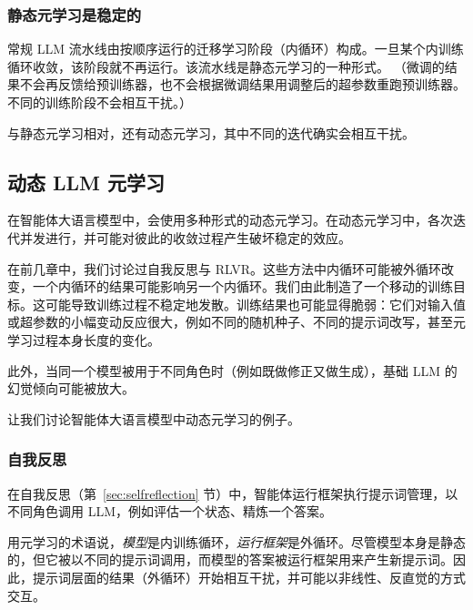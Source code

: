 \subsubsection{静态元学习是稳定的}
常规 LLM 流水线由按顺序运行的迁移学习阶段（内循环）构成。一旦某个内训练循环收敛，该阶段就不再运行。该流水线是静态元学习的一种形式。%
（微调的结果不会再反馈给预训练器，也不会根据微调结果用调整后的超参数重跑预训练器。不同的训练阶段不会相互干扰。）

与静态元学习相对，还有动态元学习，其中不同的迭代确实会相互干扰。


\subsection{动态 LLM 元学习}
在智能体大语言模型中，会使用多种形式的动态元学习。在动态元学习中，各次迭代并发进行，并可能对彼此的收敛过程产生破坏稳定的效应。

在前几章中，我们讨论过自我反思与 RLVR。这些方法中内循环可能被外循环改变，一个内循环的结果可能影响另一个内循环。我们由此制造了一个移动的训练目标。这可能导致训练过程不稳定地发散。训练结果也可能显得脆弱：它们对输入值或超参数的小幅变动反应很大，例如不同的随机种子、不同的提示词改写，甚至元学习过程本身长度的变化。

%
此外，当同一个模型被用于不同角色时（例如既做修正又做生成），基础 LLM 的幻觉倾向可能被放大。

让我们讨论智能体大语言模型中动态元学习的例子。

\subsubsection{自我反思}
在自我反思（第~\ref{sec:selfreflection} 节）中，智能体运行框架执行提示词管理，以不同角色调用 LLM，例如评估一个状态、精炼一个答案。

用元学习的术语说，{\em 模型}是内训练循环，{\em 运行框架}是外循环。尽管模型本身是静态的，但它被以不同的提示词调用，而模型的答案被运行框架用来产生新提示词。因此，提示词层面的结果（外循环）开始相互干扰，并可能以非线性、反直觉的方式交互。

